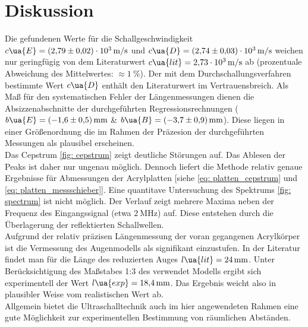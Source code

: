 \newpage
\section{Diskussion}
Die gefundenen Werte für die Schallgeschwindigkeit $c\ua{E} = \SI{+2.79(2)e+03}{\meter\per\second}$ und
$c\ua{D} = \SI{+2.74(3)e+03}{\meter\per\second}$ weichen nur geringfügig von dem Literaturwert
$c\ua{lit} = \SI{2.73e3}{\meter\per\second}$ ab (prozentuale Abweichung des Mittelwertes: $\approx \SI{1}{\percent}$).
Der mit dem Durchschallungsverfahren bestimmte Wert $c\ua{D}$
enthält den Literaturwert im Vertrauensbreich. Als Maß für den systematischen Fehler der Längenmessungen dienen
die Absizzenabschnitte der durchgeführten Regressionsrechnungen ($b\ua{E} = \SI{-1.6(5)}{\milli\meter}$ \&
$b\ua{B} = \SI{-3.7(9)}{\milli\meter}$). Diese liegen in einer Größenordnung die im Rahmen der Präzesion
der durchgeführten Messungen als plausibel erscheinen. \\
Das Cepstrum \ref{fig: cepstrum} zeigt deutliche Störungen auf. Das Ablesen der Peaks ist daher nur ungenau möglich.
Dennoch liefert die Methode relativ genaue Ergebnisse für Abmessungen der Acrylplatten [siehe \ref{eq: platten_cepstrum} und \ref{eq: platten_messschieber}].
Eine quantitave Untersuchung des Spektrums \ref{fig: spectrum} ist nicht möglich. Der Verlauf zeigt mehrere
Maxima neben der Frequenz des Eingangssignal (etwa $\SI{2}{\mega\hertz}$) auf. Diese entstehen durch die Überlagerung der
reflektierten Schallwellen. \\
Aufgrund der relativ präzisen Längenmessung der voran gegangenen Acrylkörper ist die Vermessung des Augenmodells als
signifikant einzustufen. In der Literatur \cite{sehen} findet man für die Länge des reduzierten Auges $l\ua{lit} = \SI{24}{\milli\meter}$. Unter
Berücksichtigung des Maßstabes 1:3 des verwendet Modells ergibt sich experimentell der Wert $l\ua{exp} = \SI{18.4}{\milli\meter}$. Das Ergebnis
weicht also in plausibler Weise vom realistischen Wert ab. \\
Allgemein bietet die Ultraschalltechnik auch im hier angewendeten Rahmen eine gute Möglichkeit zur experimentellen Bestimmung
von räumlichen Abständen.
